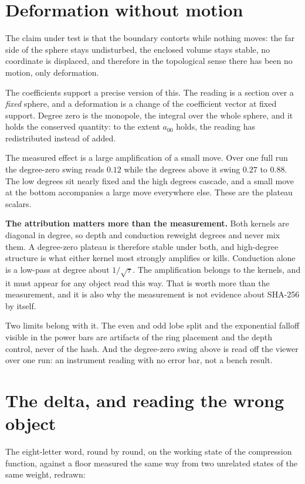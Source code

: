 \section{Deformation without motion}

The claim under test is that the boundary contorts while nothing moves: the far side of the sphere stays undisturbed, the enclosed volume stays stable, no coordinate is displaced, and therefore in the topological sense there has been no motion, only deformation.

The coefficients support a precise version of this. The reading is a section over a \emph{fixed} sphere, and a deformation is a change of the coefficient vector at fixed support. Degree zero is the monopole, the integral over the whole sphere, and it holds the conserved quantity: to the extent \(a_{00}\) holds, the reading has redistributed instead of added.

The measured effect is a large amplification of a small move. Over one full run the degree-zero swing reads \(0.12\) while the degrees above it swing \(0.27\) to \(0.88\). The low degrees sit nearly fixed and the high degrees cascade, and a small move at the bottom accompanies a large move everywhere else. These are the plateau scalars.

\textbf{The attribution matters more than the measurement.} Both kernels are diagonal in degree, so depth and conduction reweight degrees and never mix them. A degree-zero plateau is therefore stable under both, and high-degree structure is what either kernel most strongly amplifies or kills. Conduction alone is a low-pass at degree about \(1/\sqrt{\tau}\). The amplification belongs to the kernels, and it must appear for any object read this way. That is worth more than the measurement, and it is also why the measurement is not evidence about SHA-256 by itself.

Two limits belong with it. The even and odd lobe split and the exponential falloff visible in the power bars are artifacts of the ring placement and the depth control, never of the hash. And the degree-zero swing above is read off the viewer over one run: an instrument reading with no error bar, not a bench result.

\section{The delta, and reading the wrong object}

The eight-letter word, round by round, on the working state of the compression function, against a floor measured the same way from two unrelated states of the same weight, redrawn:

